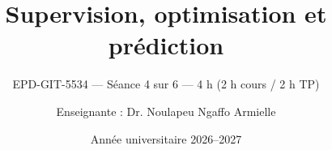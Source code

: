 
\title[EPD-GIT-5534 --- Séance 4]{Supervision, optimisation et prédiction}
\subtitle{EPD-GIT-5534 --- Séance 4 sur 6 --- 4 h (2 h cours / 2 h TP)}
\author{Enseignante : Dr. Noulapeu Ngaffo Armielle}
\date{Année universitaire 2026--2027}







